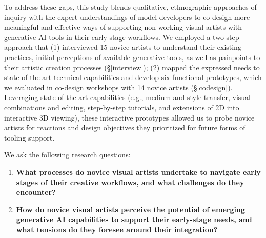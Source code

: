 To address these gaps, this study blends qualitative, ethnographic approaches of inquiry with the expert understandings of model developers to co-design more meaningful and effective ways of supporting non-working visual artists with generative AI tools in their early-stage workflows. 
We employed a two-step approach that (1) interviewed 15 novice artists to understand their existing practices, initial perceptions of available generative tools, as well as painpoints to their artistic creation processes (\S\ref{interview}); (2) mapped the expressed needs to state-of-the-art technical capabilities and develop six functional prototypes, which we evaluated in co-design workshops with 14 novice artists (\S\ref{codesign}).
Leveraging state-of-the-art capabilities (e.g., medium and style transfer, visual combinations and editing, step-by-step tutorials, and extensions of 2D into interactive 3D viewing),
these interactive prototypes allowed us to probe novice artists for reactions and design objectives they prioritized for future forms of tooling support. 


We ask the following research questions:
\begin{enumerate}
\item[\textbf{RQ 1}] 
\textbf{What processes do novice visual artists undertake to navigate early stages of their creative workflows, and what challenges do they encounter?}
\item[\textbf{RQ 2}] 
\textbf{How do novice visual artists perceive the potential of emerging generative AI capabilities to support their early-stage needs, and what tensions do they foresee around their integration?}

\end{enumerate}



